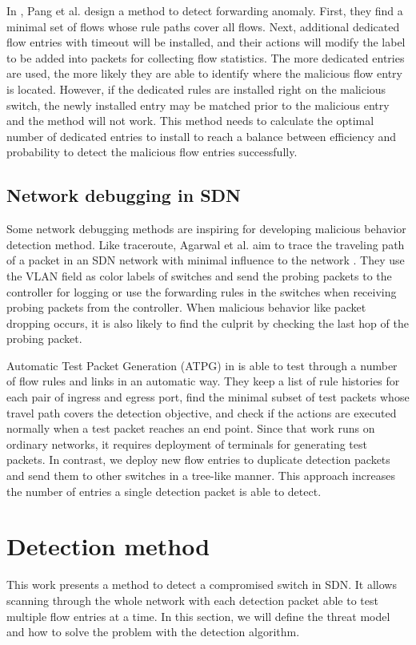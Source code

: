 \documentclass[conference]{IEEEtran}
\begin{document}
In \cite{PJL16}, Pang et al. design a method to detect forwarding anomaly. First, they find a minimal set of flows whose rule paths cover all flows. Next, additional dedicated flow entries with timeout will be installed, and their actions will modify the label to be added into packets for collecting flow statistics. The more dedicated entries are used, the more likely they are able to identify where the malicious flow entry is located. However, if the dedicated rules are installed right on the malicious switch, the newly installed entry may be matched prior to the malicious entry and the method will not work. This method needs to calculate the optimal number of dedicated entries to install to reach a balance between efficiency and probability to detect the malicious flow entries successfully.

\subsection{Network debugging in SDN}
Some network debugging methods are inspiring for developing malicious behavior detection method. Like traceroute, Agarwal et al. aim to trace the traveling path of a packet in an SDN network with minimal influence to the network \cite{ARDC14}. They use the VLAN field as color labels of switches and send the probing packets to the controller for logging or use the forwarding rules in the switches when receiving probing packets from the controller. When malicious behavior like packet dropping occurs, it is also likely to find the culprit by checking the last hop of the probing packet.

Automatic Test Packet Generation (ATPG) in \cite{ZKVM12} is able to test through a number of flow rules and links in an automatic way. They keep a list of rule histories for each pair of ingress and egress port, find the minimal subset of test packets whose travel path covers the detection objective, and check if the actions are executed normally when a test packet reaches an end point. Since that work runs on ordinary networks, it requires deployment of terminals for generating test packets. In contrast, we deploy new flow entries to duplicate detection packets and send them to other switches in a tree-like manner. This approach increases the number of entries a single detection packet is able to detect. 

\section{Detection method}
\label{sec:method}
This work presents a method to detect a compromised switch in SDN. It allows scanning through the whole network with each detection packet able to test multiple flow entries at a time. In this section, we will define the threat model and how to solve the problem with the detection algorithm.
\end{document}
